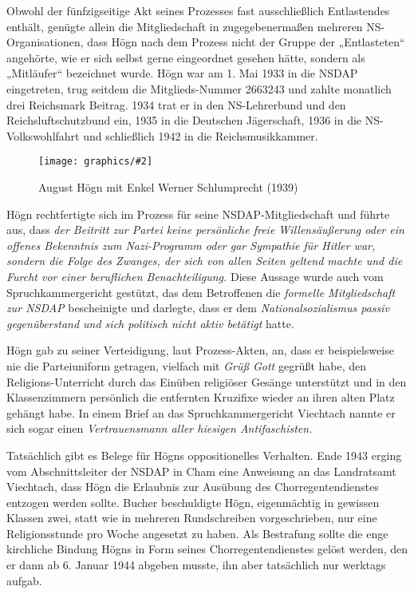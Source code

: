 \documentclass{book}
\newcommand{\img}[2][width=\linewidth]{\noindent\texttt{[image: graphics/\#2]}}
\begin{document}
Obwohl der fünfzigseitige Akt seines Prozesses fast ausschließlich
Entlastendes enthält, genügte allein die Mitgliedschaft in
zugegebenermaßen mehreren NS-Organisationen, dass Högn nach dem
Prozess nicht der Gruppe der „Entlasteten“ angehörte, wie er sich
selbst gerne eingeordnet gesehen hätte, sondern als „Mitläufer“
bezeichnet wurde. Högn war am 1. Mai 1933 in die NSDAP eingetreten,
trug seitdem die Mitglieds-Nummer 2663243 und zahlte monatlich drei
Reichsmark Beitrag. 1934 trat er in den NS-Lehrerbund und den
Reichsluftschutzbund ein, 1935 in die Deutschen Jägerschaft, 1936 in
die NS-Volkswohlfahrt und schließlich 1942 in die Reichsmusikkammer.

\begin{figure}
\img{Hoegn-mit-Enkel}
\caption{August Högn mit Enkel Werner Schlumprecht (1939)}
\end{figure}

Högn rechtfertigte sich im Prozess für seine NSDAP-Mitgliedschaft und
führte aus, dass \textit{der Beitritt zur Partei keine persönliche
freie Willensäußerung oder ein offenes Bekenntnis zum Nazi-Programm
oder gar Sympathie für Hitler war, sondern die Folge des Zwanges, der
sich von allen Seiten geltend machte und die Furcht vor einer
beruflichen Benachteiligung.} Diese Aussage wurde auch vom
Spruchkammergericht gestützt, das dem Betroffenen die
\textit{formelle Mitgliedschaft zur NSDAP} bescheinigte und darlegte,
dass er dem \textit{Nationalsozialismus passiv gegenüberstand und sich
politisch nicht aktiv betätigt} hatte.

Högn gab zu seiner Verteidigung, laut Prozess-Akten, an, dass er
beispielsweise nie die Parteiuniform getragen, vielfach mit
\textit{Grüß Gott} gegrüßt habe, den Religions-Unterricht durch das
Einüben religiöser Gesänge unterstützt und in den Klassenzimmern
persönlich die entfernten Kruzifixe wieder an ihren alten Platz gehängt
habe. In einem Brief an das Spruchkammergericht Viechtach nannte er
sich sogar einen \textit{Vertrauensmann aller hiesigen Antifaschisten.}

Tatsächlich gibt es Belege für Högns oppositionelles Verhalten. Ende
1943 erging vom Abschnittsleiter der NSDAP in Cham eine Anweisung an
das Landratsamt Viechtach, dass Högn die Erlaubnis zur Ausübung des
Chorregentendienstes entzogen werden sollte. Bucher beschuldigte
Högn, eigenmächtig in gewissen Klassen zwei, statt wie in mehreren
Rundschreiben vorgeschrieben, nur eine Religionsstunde pro Woche
angesetzt zu haben. Als Bestrafung sollte die enge kirchliche Bindung
Högns in Form seines Chorregentendienstes gelöst werden, den er dann
ab 6. Januar 1944 abgeben musste, ihn aber tatsächlich nur werktags
aufgab.
\end{document}
